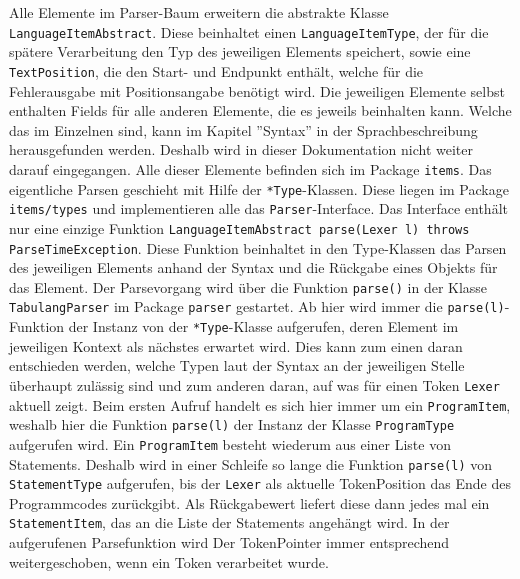 Alle Elemente im Parser-Baum erweitern die abstrakte Klasse \texttt{LanguageItemAbstract}. 
Diese beinhaltet einen \texttt{LanguageItemType}, der für die spätere Verarbeitung den Typ des jeweiligen Elements speichert, sowie eine \texttt{TextPosition}, die den Start- und Endpunkt enthält, welche für die Fehlerausgabe mit Positionsangabe benötigt wird.
Die jeweiligen Elemente selbst enthalten Fields für alle anderen Elemente, die es jeweils beinhalten kann. 
Welche das im Einzelnen sind, kann im Kapitel ''Syntax'' in der Sprachbeschreibung herausgefunden werden. Deshalb wird in dieser Dokumentation nicht weiter darauf eingegangen.
Alle dieser Elemente befinden sich im Package \texttt{items}. 
\newline
\newline
Das eigentliche Parsen geschieht mit Hilfe der \texttt{*Type}-Klassen.
Diese liegen im Package \texttt{items/types} und implementieren alle das \texttt{Parser}-Interface.
Das Interface enthält nur eine einzige Funktion \texttt{LanguageItemAbstract parse(Lexer l) throws ParseTimeException}. Diese Funktion beinhaltet in den Type-Klassen das Parsen des jeweiligen Elements anhand der Syntax und die Rückgabe eines Objekts für das Element.
\newline
\newline
Der Parsevorgang wird über die Funktion \texttt{parse()} in der Klasse \texttt{TabulangParser} im Package \texttt{parser} gestartet. Ab hier wird immer die \texttt{parse(l)}-Funktion der Instanz von der \texttt{*Type}-Klasse aufgerufen, deren Element im jeweiligen Kontext als nächstes erwartet wird. 
Dies kann zum einen daran entschieden werden, welche Typen laut der Syntax an der jeweiligen Stelle überhaupt zulässig sind und zum anderen daran, auf was für einen Token \texttt{Lexer} aktuell zeigt. 
Beim ersten Aufruf handelt es sich hier immer um ein \texttt{ProgramItem}, weshalb hier die Funktion \texttt{parse(l)} der Instanz der Klasse \texttt{ProgramType} aufgerufen wird.
Ein \texttt{ProgramItem} besteht wiederum aus einer Liste von Statements. Deshalb wird in einer Schleife so lange die Funktion \texttt{parse(l)} von \texttt{StatementType} aufgerufen, bis der \texttt{Lexer} als aktuelle TokenPosition das Ende des Programmcodes zurückgibt. Als Rückgabewert liefert diese dann jedes mal ein \texttt{StatementItem}, das an die Liste der Statements angehängt wird. In der aufgerufenen Parsefunktion wird Der TokenPointer immer entsprechend weitergeschoben, wenn ein Token verarbeitet wurde.

